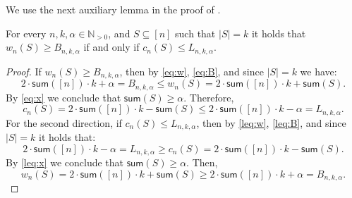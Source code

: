 	
%	
%	

We use the next auxiliary lemma in the proof of . 
	\begin{lemma}
	\label{lemma:wl}
	For every $n,k,\alpha \in \mathbb{N}_{>0}$, and $S \subseteq [n]$ such that  $|S| = k$ it holds that $w_n(S) \geq B_{n,k,\alpha}$ if and only if $c_n(S) \leq L_{n,k,\alpha}$. 
\end{lemma}

\begin{proof}
	If $w_n(S) \geq B_{n,k,\alpha}$, then by \eqref{eq:w}, \eqref{eq:B}, and since $|S| = k$ we have: \begin{equation}
		\label{eq:x}
		2 \cdot \textsf{sum}([n]) \cdot k+\alpha = B_{n,k,\alpha} \leq w_n(S) = 2 \cdot \textsf{sum}([n]) \cdot k+\textsf{sum}(S).
	\end{equation} By \eqref{eq:x} we conclude that $\textsf{sum}(S) \geq \alpha$. Therefore, 
	$$c_n(S) = 2 \cdot \textsf{sum}([n]) \cdot k-\textsf{sum}(S) \leq 2 \cdot \textsf{sum}([n]) \cdot k- \alpha = L_{n,k,\alpha}.$$
	For the second direction, if $c_n(S) \leq L_{n,k,\alpha}$, then by \eqref{leq:w}, \eqref{leq:B}, and since $|S| = k$ it holds that: \begin{equation}
		\label{leq:x}
		2 \cdot \textsf{sum}([n]) \cdot k-\alpha = L_{n,k,\alpha} \geq c_n(S) = 2 \cdot \textsf{sum}([n]) \cdot k-\textsf{sum}(S).
	\end{equation} By \eqref{leq:x} we conclude that $\textsf{sum}(S) \geq \alpha$. Then, 
	$$w_n(S) = 2 \cdot \textsf{sum}([n]) \cdot k+\textsf{sum}(S) \geq 2 \cdot \textsf{sum}([n]) \cdot k+ \alpha = B_{n,k,\alpha}.$$
\end{proof}

